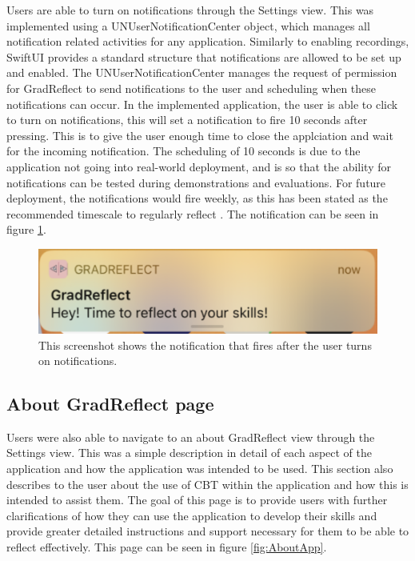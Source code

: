 \documentclass{l4proj}
\begin{document}
Users are able to turn on notifications through the Settings view. This was implemented using a UNUserNotificationCenter object, which manages all notification related activities for any application. Similarly to enabling recordings, SwiftUI provides a standard structure that notifications are allowed to be set up and enabled. The UNUserNotificationCenter manages the request of permission for GradReflect to send notifications to the user and scheduling when these notifications can occur. In the implemented application, the user is able to click to turn on notifications, this will set a notification to fire 10 seconds after pressing. This is to give the user enough time to close the applciation and wait for the incoming notification. The scheduling of 10 seconds is due to the application not going into real-world deployment, and is so that the ability for notifications can be tested during demonstrations and evaluations. For future deployment, the notifications would fire weekly, as this has been stated as the recommended timescale to regularly reflect \citep{bruno_reflective_2018}. The notification can be seen in figure \ref{fig:Notification}.

\begin{figure}
    \centering
    \includegraphics[scale=0.4]{images/Notification.pdf}    
    \caption{This screenshot shows the notification that fires after the user turns on notifications.}
    \label{fig:Notification} 
\end{figure}

\subsection{About GradReflect page}

Users were also able to navigate to an about GradReflect view through the Settings view. This was a simple description in detail of each aspect of the application and how the application was intended to be used. This section also describes to the user about the use of CBT within the application and how this is intended to assist them. The goal of this page is to provide users with further clarifications of how they can use the application to develop their skills and provide greater detailed instructions and support necessary for them to be able to reflect effectively. This page can be seen in figure \ref{fig:AboutApp}.
\end{document}
